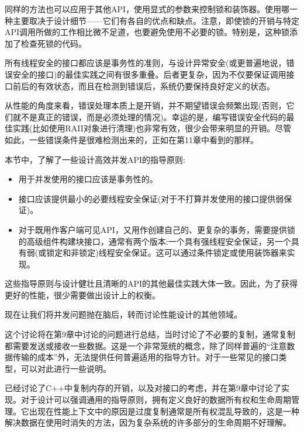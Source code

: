 同样的方法也可以应用于其他API，使用显式的参数来控制锁和装饰器。使用哪一种主要取决于设计细节——它们有各自的优点和缺点。注意，即使锁的开销与特定API调用所做的工作相比微不足道，也要避免使用不必要的锁。特别是，这种锁添加了检查死锁的代码。

所有线程安全的接口都应该是事务性的准则，与设计异常安全(或更普遍地说，错误安全的接口)的最佳实践之间有很多重叠。后者更复杂，因为不仅要保证调用接口前后的有效状态，而且在检测到错误后，系统仍要保持良好定义的状态。 

从性能的角度来看，错误处理本质上是开销，并不期望错误会频繁出现(否则，它们就不是真正的错误，而是必须处理的情况)。幸运的是，编写错误安全代码的最佳实践(比如使用RAII对象进行清理)也非常有效，很少会带来明显的开销。尽管如此，一些错误条件是很难检测出来的，正如在第11章中看到的那样。

本节中，了解了一些设计高效并发API的指导原则:

\begin{itemize}
\item 
用于并发使用的接口应该是事务性的。

\item 
接口应该提供最小的必要线程安全保证(对于不打算并发使用的接口提供弱保证)。

\item 
对于既用作客户端可见API，又用作创建自己的、更复杂的事务，需要提供锁的高级组件构建块接口，通常有两个版本:一个具有强线程安全保证，另一个具有弱(或锁定和非锁定)线程安全保证。这可以通过条件锁定或使用装饰器来实现。
\end{itemize}

这些指导原则与设计健壮且清晰的API的其他最佳实践大体一致。因此，为了获得更好的性能，很少需要做出设计上的权衡。 

现在让我们将并发问题抛在脑后，转而讨论性能设计的其他领域。


这个讨论将在第9章中讨论的问题进行总结，当时讨论了不必要的复制，通常复制都需要发送或接收一些数据。这是一个非常笼统的概念，除了同样普遍的“注意数据传输的成本”外，无法提供任何普遍适用的指导方针。对于一些常见的接口类型，可以对此进行一些说明。 

已经讨论了C++中复制内存的开销，以及对接口的考虑，并在第9章中讨论了实现。对于设计可以强调通用的指导原则，拥有定义良好的数据所有权和生命周期管理。它出现在性能上下文中的原因是过度复制通常是所有权混乱导致的，这是一种解决数据在使用时消失的方法，因为复杂系统的许多部分的生命周期不好理解。 

